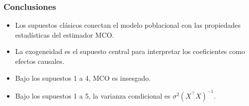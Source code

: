 \documentclass{beamer}
\begin{document}
\begin{frame}
\frametitle{Conclusiones}
\begin{itemize}
    \item Los supuestos clásicos conectan el modelo poblacional con las propiedades estadísticas del estimador MCO.
    \item La exogeneidad es el supuesto central para interpretar los coeficientes como efectos causales.
    \item Bajo los supuestos 1 a 4, MCO es insesgado.
    \item Bajo los supuestos 1 a 5, la varianza condicional es \(\sigma^2(X^\top X)^{-1}\).
\end{itemize}
\end{frame}
\end{document}
